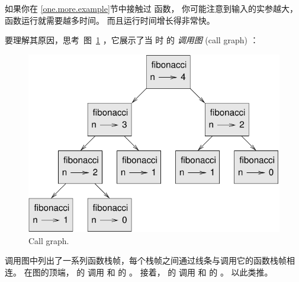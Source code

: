
如果你在 \ref{one.more.example}节中接触过  函数， 你可能注意到输入的实参越大，函数运行就需要越多时间。
而且运行时间增长得非常快。

  


要理解其原因，思考 图~\ref{fig.fibonacci} ，它展示了当  时  的 {\em 调用图} (call graph) ：

\begin{figure}
\centerline
{\includegraphics[scale=0.7]{../source/figs/fibonacci.pdf}}
\caption{Call graph.}
\label{fig.fibonacci}
\end{figure}


调用图中列出了一系列函数栈帧，每个栈帧之间通过线条与调用它的函数栈帧相连。
在图的顶端， 的  调用  和  的  。 接着，  的  调用  和  的 。 以此类推。

